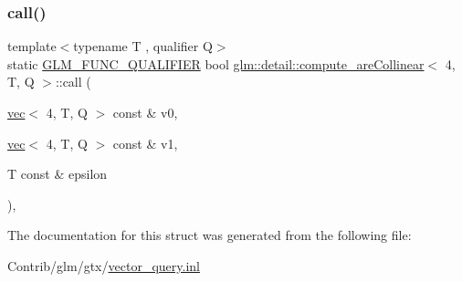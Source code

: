 \subsubsection{\texorpdfstring{call()}{call()}}
{\footnotesize\ttfamily template$<$typename T , qualifier Q$>$ \\
static \mbox{\hyperlink{setup_8hpp_a33fdea6f91c5f834105f7415e2a64407}{G\+L\+M\+\_\+\+F\+U\+N\+C\+\_\+\+Q\+U\+A\+L\+I\+F\+I\+ER}} bool \mbox{\hyperlink{structglm_1_1detail_1_1compute__are_collinear}{glm\+::detail\+::compute\+\_\+are\+Collinear}}$<$ 4, T, Q $>$\+::call (\begin{DoxyParamCaption}\item[{\mbox{\hyperlink{structglm_1_1vec}{vec}}$<$ 4, T, Q $>$ const \&}]{v0,  }\item[{\mbox{\hyperlink{structglm_1_1vec}{vec}}$<$ 4, T, Q $>$ const \&}]{v1,  }\item[{T const \&}]{epsilon }\end{DoxyParamCaption})\hspace{0.3cm}{\ttfamily [inline]}, {\ttfamily [static]}}



The documentation for this struct was generated from the following file\+:\begin{DoxyCompactItemize}
\item 
Contrib/glm/gtx/\mbox{\hyperlink{vector__query_8inl}{vector\+\_\+query.\+inl}}\end{DoxyCompactItemize}
